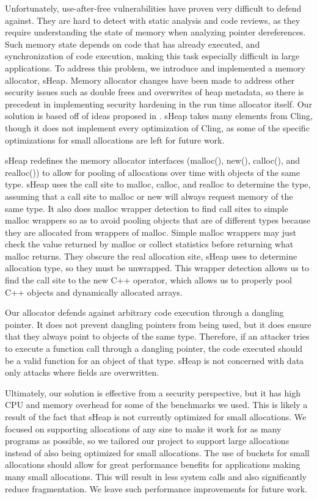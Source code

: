 \documentclass[conference]{IEEEtran}
\begin{document}
Unfortunately, use-after-free vulnerabilities have proven very difficult 
to defend against. They are hard to detect with static analysis and code 
reviews, as they require understanding the state of memory when analyzing 
pointer dereferences. Such memory state depends on code that has already 
executed, and synchronization of code execution, making this task 
especially difficult in large applications. To address this problem, we 
introduce and implemented a memory allocator, sHeap. Memory allocator 
changes have been made to address other security issues such as double 
frees and overwrites of heap metadata, so there is precedent in 
implementing security hardening in the run time allocator itself. Our 
solution is based off of ideas proposed in \cite{b1}. sHeap takes many 
elements from Cling, though it does not implement every optimization of 
Cling, as some of the specific optimizations for small allocations are 
left for future work. 

sHeap redefines the memory allocator interfaces (malloc(), new(), 
calloc(), and realloc()) to allow for pooling of allocations over time 
with objects of the same type. sHeap uses the call site to malloc, 
calloc, and realloc to determine the type, assuming that a call site to 
malloc or new will always request memory of the same type. It also does 
malloc wrapper detection to find call sites to simple malloc wrappers so 
as to avoid pooling objects that are of different types because they are 
allocated from wrappers of malloc. Simple malloc wrappers may just check the value returned by malloc or collect statistics before returning what malloc returns. They obscure the real allocation site, sHeap uses to determine allocation type, so they must be unwrapped.  This wrapper detection allows us to find the call site to the new C++ operator, which allows us to properly pool C++ objects and dynamically allocated arrays. 

Our allocator defends against arbitrary code execution through a dangling 
pointer.  It does not prevent dangling pointers from being used, but it 
does ensure that they always point to objects of the same type. Therefore, 
if an attacker tries to execute a function call through a dangling 
pointer, the code executed should be a valid function for an object of 
that type.  sHeap is not concerned with data only attacks where fields 
are overwritten. 

Ultimately, our solution is effective from a security perspective, but it 
has high CPU and memory overhead for some of the benchmarks we used. This 
is likely a result of the fact that sHeap is not currently optimized for 
small allocations.  We focused on supporting allocations of any size to 
make it work for as many programs as possible, so we tailored our project 
to support large allocations instead of also being optimized for small 
allocations.  The use of buckets for small allocations should allow for 
great performance benefits for applications making many small allocations. 
This will result in less system calls and also significantly reduce 
fragmentation. We leave such performance improvements for future work.
\end{document}
